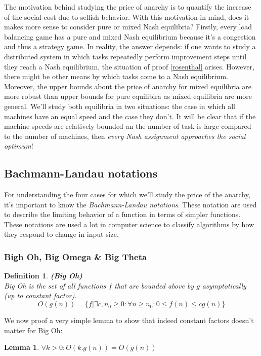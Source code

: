 \documentclass[a4paper,11pt]{article}
\newtheorem{lemma}[theorem]{Lemma}
\newtheorem{definition}[theorem]{Definition}
\begin{document}
The motivation behind studying the price of anarchy is to quantify the increase of the social cost due to selfish behavior. With this motivation in mind, does it makes more sense to consider pure or mixed Nash equilibria? Firstly, every load balancing game has a pure and mixed Nash equilibrium because it's a congestion and thus a strategy game. In reality, the answer depends: if one wants to study a distributed system in which tasks repeatedly perform improvement steps until they reach a Nash equilibrium, the situation of proof \ref{rosenthal} arises. However, there might be other means by which tasks come to a Nash equilibrium. Moreover, the upper bounds about the price of anarchy for mixed equilibria are more robust than upper bounds for pure equilibira as mixed equilibria are more general. We'll study both equilibria in two situations: the case in which all machines have an equal speed and the case they don't. It will be clear that if the machine speeds are relatively bounded an the number of task is large compared to the number of machines, then \emph{every Nash assignment approaches the social optimum}!

\subsection{Bachmann-Landau notations}
For understanding the four cases for which we'll study the price of the anarchy, it's important to know the \emph{Bachmann-Landau notations}. These notation are used to describe the limiting behavior of a function in terms of simpler functions. These notations are used a lot in computer science to classify algorithms by how they respond to change in input size.

\subsubsection{Bigh Oh, Big Omega \& Big Theta}
\begin{definition}\textbf{(Big Oh)}\cite{11}\\
Big Oh is the set of all functions $f$ that are bounded above by $g$ asymptotically (up to constant factor).
$$O(g(n)) = \{f|\exists c, n_0 \geq 0: \forall n \geq n_0 : 0 \leq f(n) \leq cg(n)\}$$
\end{definition}
We now proof a very simple lemma to show that indeed constant factors doesn't matter for Big Oh:
\begin{lemma}\label{constanten}
$\forall k > 0: O(k.g(n)) = O(g(n))$
\end{lemma}
\end{document}
